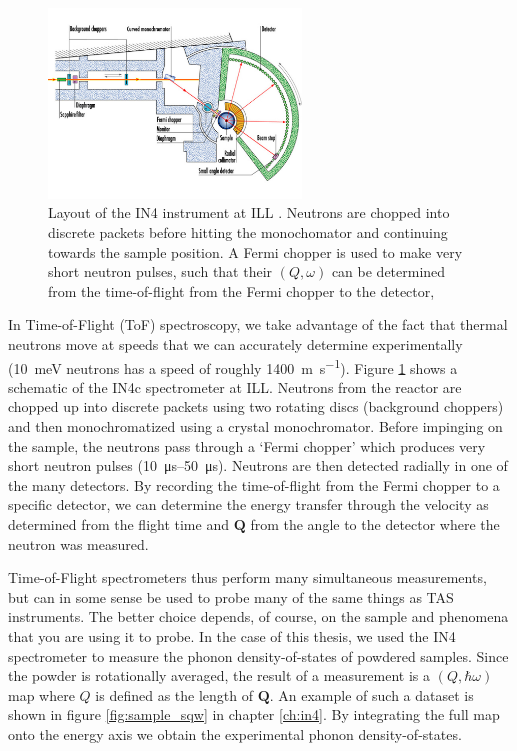 \begin{figure}
	\centering
	\includegraphics[width=0.6\textwidth]{fig/method/ns/in4.jpg}
	\caption[in4 layout]{Layout of the IN4 instrument at ILL \cite{in4}. Neutrons are chopped into discrete packets before hitting the monochomator and continuing towards the sample position. A Fermi chopper is used to make very short neutron pulses, such that their $(Q,\omega)$ can be determined from the time-of-flight from the Fermi chopper to the detector,}
	\label{fig:in4}
\end{figure}

In Time-of-Flight (ToF) spectroscopy, we take advantage of the fact that thermal neutrons move at speeds that we can accurately determine experimentally (\SI{10}{\milli\eV} neutrons has a speed of roughly \SI{1400}{\meter\per\second}). Figure \ref{fig:in4} shows a schematic of the IN4c spectrometer at ILL. Neutrons from the reactor are chopped up into discrete packets using two rotating discs (background choppers) and then monochromatized using a crystal monochromator. Before impinging on the sample, the neutrons pass through a `Fermi chopper' which produces very short neutron pulses (\SIrange{10}{50}{\micro\second}). Neutrons are then detected radially in one of the many detectors. By recording the time-of-flight from the Fermi chopper to a specific detector, we can determine the energy transfer through the velocity as determined from the flight time and $\bm{Q}$ from the angle to the detector where the neutron was measured.

Time-of-Flight spectrometers thus perform many simultaneous measurements, but can in some sense be used to probe many of the same things as TAS instruments. The better choice depends, of course, on the sample and phenomena that you are using it to probe. In the case of this thesis, we used the IN4 spectrometer to measure the phonon density-of-states of powdered samples. Since the powder is rotationally averaged, the result of a measurement is a $(Q,\hbar\omega)$ map where $Q$ is defined as the length of $\bm{Q}$. An example of such a dataset is shown in figure \ref{fig:sample_sqw} in chapter \ref{ch:in4}. By integrating the full map onto the energy axis we obtain the experimental phonon density-of-states.

